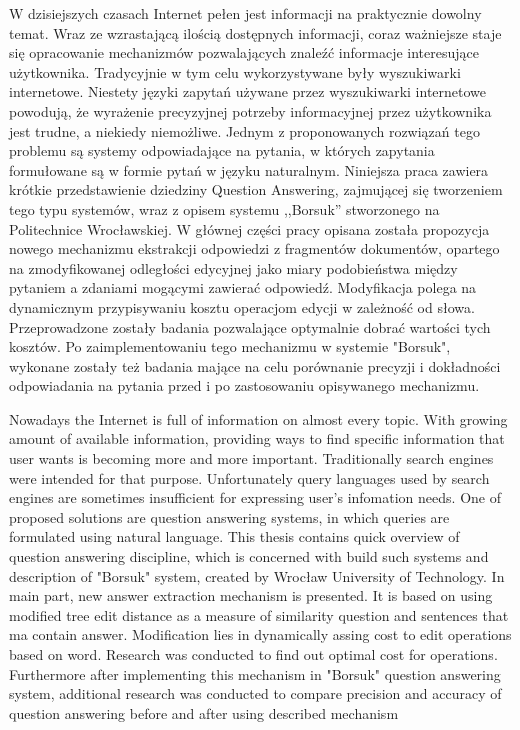 \documentclass[a4paper, twoside, 12pt]{report}
\newenvironment{abstractpage}
  {\vspace*{\fill}\thispagestyle{empty}}
    {\vfill}
\renewenvironment{abstract}[1]
      {\bigskip\selectlanguage{#1}%
             \begin{center}\bfseries\abstractname\end{center}}
           {\par\bigskip}
\begin{document}
% 


\begin{abstractpage}
\begin{abstract}{polish}
    W dzisiejszych czasach Internet pełen jest informacji na praktycznie dowolny temat. Wraz ze wzrastającą ilością
    dostępnych informacji, coraz ważniejsze staje się opracowanie mechanizmów pozwalających znaleźć informacje
    interesujące użytkownika. Tradycyjnie w tym celu wykorzystywane były wyszukiwarki internetowe. Niestety
    języki zapytań używane przez wyszukiwarki internetowe powodują, że wyrażenie precyzyjnej potrzeby informacyjnej
    przez użytkownika jest trudne, a niekiedy niemożliwe. Jednym z proponowanych rozwiązań tego problemu są systemy
    odpowiadające na pytania, w których zapytania formułowane są w formie pytań w języku naturalnym. Niniejsza
    praca zawiera krótkie przedstawienie dziedziny Question Answering, zajmującej się tworzeniem tego typu systemów,
    wraz z opisem systemu ,,Borsuk'' stworzonego na Politechnice Wrocławskiej.
    W głównej części pracy opisana została propozycja nowego mechanizmu ekstrakcji odpowiedzi z fragmentów dokumentów,
    opartego na zmodyfikowanej odległości edycyjnej jako miary podobieństwa między pytaniem a zdaniami mogącymi zawierać
    odpowiedź. Modyfikacja polega na dynamicznym przypisywaniu kosztu operacjom edycji w zależność od słowa. Przeprowadzone
    zostały badania pozwalające optymalnie dobrać wartości tych kosztów. Po zaimplementowaniu tego mechanizmu w systemie "Borsuk",
    wykonane zostały też badania mające na celu porównanie precyzji i dokładności odpowiadania na pytania przed i po
    zastosowaniu opisywanego mechanizmu.
\end{abstract}

\begin{abstract}{english}
    Nowadays the Internet is full of information on almost every topic. With growing amount of available information,
    providing ways to find specific information that user wants is becoming more and more important. Traditionally
    search engines were intended for that purpose. Unfortunately query languages used by search engines are sometimes
    insufficient for expressing user's infomation needs. One of proposed solutions are question answering systems, in which
    queries are formulated using natural language. This thesis contains quick overview of question answering discipline,
    which is concerned with build such systems and description of "Borsuk" system, created by Wrocław University of Technology.
    In main part, new answer extraction mechanism is presented. It is based on using modified tree edit distance as a measure of
    similarity question and sentences that ma contain answer. Modification lies in dynamically assing cost to edit operations
    based on word. Research was conducted to find out optimal cost for operations. Furthermore after implementing this
    mechanism in "Borsuk" question answering system, additional research was conducted to compare precision and accuracy
    of question answering before and after using described mechanism
\end{abstract}
\end{abstractpage}
\end{document}
